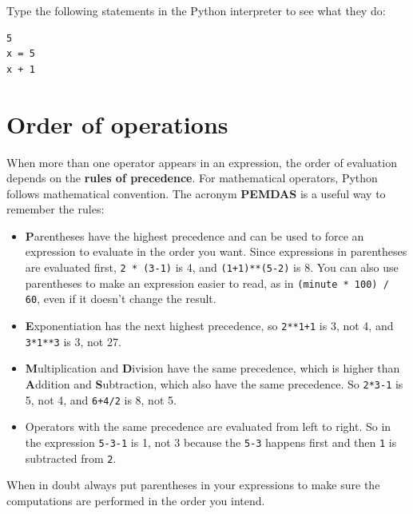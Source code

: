 \documentclass[10pt]{book}
\begin{document}
\begin{ex}
Type the following statements in the Python interpreter to see
what they do:

\beforeverb
\begin{verbatim}
5
x = 5
x + 1
\end{verbatim}
\afterverb
%
\end{ex}


\section{Order of operations}

When more than one operator appears in an expression, the order of
evaluation depends on the {\bf rules of precedence}.  For
mathematical operators, Python follows mathematical convention.
The acronym {\bf PEMDAS} is a useful way to
remember the rules:


\begin{itemize}

\item {\bf P}arentheses have the highest precedence and can be used 
to force an expression to evaluate in the order you want. Since
expressions in parentheses are evaluated first, {\tt 2 * (3-1)} is 4,
and {\tt (1+1)**(5-2)} is 8. You can also use parentheses to make an
expression easier to read, as in {\tt (minute * 100) / 60}, even
if it doesn't change the result.

\item {\bf E}xponentiation has the next highest precedence, so
{\tt 2**1+1} is 3, not 4, and {\tt 3*1**3} is 3, not 27.

\item {\bf M}ultiplication and {\bf D}ivision have the same precedence,
which is higher than {\bf A}ddition and {\bf S}ubtraction, which also
have the same precedence.  So {\tt 2*3-1} is 5, not 4, and
{\tt 6+4/2} is 8, not 5.

\item Operators with the same precedence are evaluated from left to 
right.  So in the expression {\tt 5-3-1} is 1, not 3 because the
{\tt 5-3} happens first and then {\tt 1} is subtracted from {\tt 2}.

\end{itemize}

When in doubt always put parentheses in your expressions to make sure
the computations are performed in the order you intend.
\end{document}
